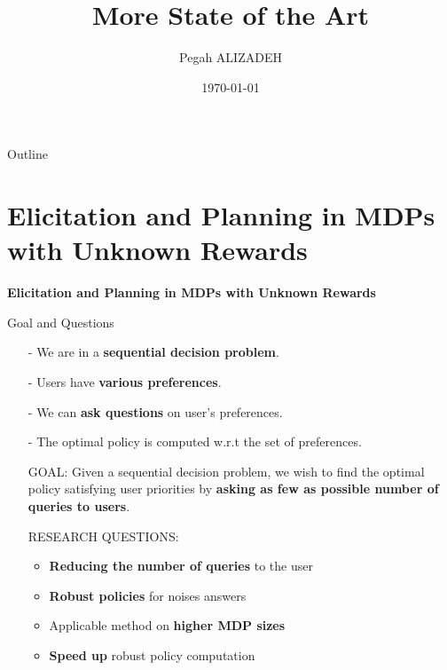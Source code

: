 \documentclass{beamer}
\title[Short title]{More State of the Art} %
\author{Pegah ALIZADEH} %
\institute[GREYC] %
{
University of Caen Normandy (Labratoire GREYC) \\ %
\medskip
\textit{pegah.alizadeh@unicaen.fr} %
}
\date{\today} %
\begin{document}
\begin{frame}
\titlepage %
\end{frame}

\begin{frame}{Outline}
\tableofcontents
\end{frame}


\section{Elicitation and Planning in MDPs with Unknown Rewards}

\begin{frame}
\begin{center}
\textbf{Elicitation and Planning in MDPs with Unknown Rewards}
\end{center}
\end{frame}

\begin{frame}{Goal and Questions}

\begin{itemize}
\item[-] We are in a \textbf{sequential decision problem}.
\item[-] Users have \textbf{various preferences}.
\item[-] We can \textbf{ask questions} on user's preferences.
\item[-] The optimal policy is computed w.r.t the set of preferences.
\end{itemize}

\begin{bclogo}[arrondi = 0.1, logo=, ombre = true]{}
\begin{itemize}
\item[] {\color{red} GOAL}: Given a sequential decision problem, we wish to find the optimal policy satisfying user priorities by \textbf{asking as few as possible number of queries to users}.
\item[] {\color{red} RESEARCH QUESTIONS}: 

\begin{itemize}
\item\textbf{Reducing the number of queries} to the user 
\item \textbf{Robust policies} for noises answers
\item Applicable method on \textbf{higher MDP sizes}
\item \textbf{Speed up} robust policy computation
\end{itemize}

\end{itemize}
\end{bclogo}

\end{frame}
\end{document}
